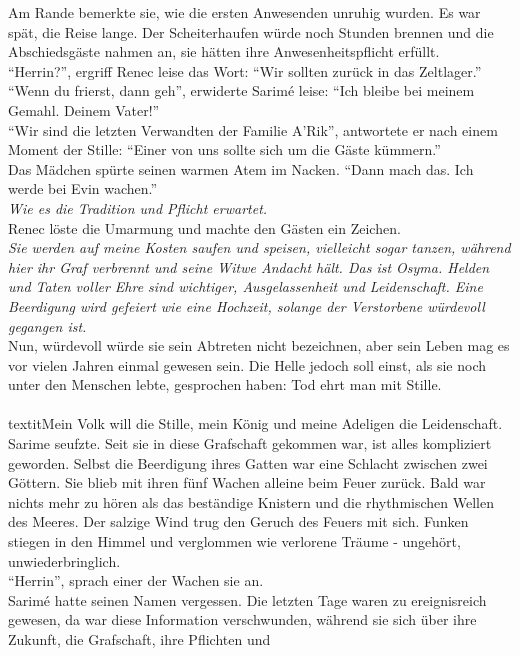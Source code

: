 Am Rande bemerkte sie, wie die ersten Anwesenden unruhig wurden. Es war spät, die Reise lange. Der 
Scheiterhaufen würde noch Stunden brennen und die Abschiedsgäste nahmen an, sie hätten ihre 
Anwesenheitspflicht erfüllt. \\
``Herrin?'', ergriff Renec leise das Wort: ``Wir sollten zurück in das Zeltlager.''\\
``Wenn du frierst, dann geh'', erwiderte Sarimé leise: ``Ich bleibe bei meinem Gemahl. Deinem 
Vater!''\\
``Wir sind die letzten Verwandten der Familie A'Rik'', antwortete er nach einem Moment der Stille: 
``Einer von uns sollte sich um die Gäste kümmern.''\\
Das Mädchen spürte seinen warmen Atem im Nacken. ``Dann mach das. Ich werde bei Evin wachen.''\\
\textit{Wie es die Tradition und Pflicht erwartet.}\\
Renec löste die Umarmung und machte den Gästen ein Zeichen.\\
\textit{Sie werden auf meine Kosten saufen und speisen, vielleicht sogar tanzen, während hier 
ihr Graf verbrennt und seine Witwe Andacht hält. Das ist Osyma. Helden und Taten voller Ehre sind 
wichtiger, Ausgelassenheit und Leidenschaft. Eine Beerdigung wird gefeiert wie eine Hochzeit, 
solange der Verstorbene würdevoll gegangen ist.}\\
Nun, würdevoll würde sie sein Abtreten nicht bezeichnen, aber sein Leben mag es vor vielen Jahren 
einmal gewesen sein. Die Helle jedoch soll einst, als sie noch unter den Menschen lebte, gesprochen 
haben: Tod ehrt man mit Stille.\\
\\textit{Mein Volk will die Stille, mein König und meine Adeligen die Leidenschaft.}\\
Sarime seufzte. Seit sie in diese Grafschaft gekommen war, ist alles kompliziert geworden. Selbst 
die Beerdigung ihres Gatten war eine Schlacht zwischen zwei Göttern. Sie blieb mit ihren fünf 
Wachen alleine beim Feuer zurück. Bald war nichts mehr zu hören als das beständige Knistern und die 
rhythmischen Wellen des Meeres. Der salzige Wind trug den Geruch des Feuers mit sich. Funken 
stiegen in den Himmel und verglommen wie verlorene Träume - ungehört, unwiederbringlich. \\
``Herrin'', sprach einer der Wachen sie an.\\
Sarimé hatte seinen Namen vergessen. Die letzten Tage waren zu ereignisreich gewesen, da war diese 
Information verschwunden, während sie sich über ihre Zukunft, die Grafschaft, ihre Pflichten und 

